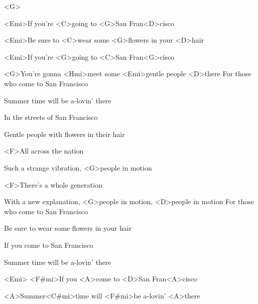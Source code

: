 

<G>

\zs
<Emi>If you're <C>going to <G>San Fran<D>cisco

<Emi>Be sure to <C>wear some <G>flowers in your <D>hair

<Emi>If you're <G>going to <C>San Fran<G>cisco

<G>You're gonna <Hmi>meet some <Emi>gentle people <D>there
\ks
\zs
For those who come to San Francisco

Summer time will be a-lovin' there

In the streets of San Francisco

Gentle people with flowers in their hair
\ks

\zr
<F>All across the nation

Such a strange vibration, <G>people in motion

<F>There's a whole generation

With a new explanation, <G>people in motion, <D>people in motion
\kr
\zs
For those who come to San Francisco

Be sure to wear some flowers in your hair

If you come to San Francisco

Summer time will be a-lovin' there
\ks

\zs
<Emi> <F#mi>If you <A>come to <D>San Fran<A>cisco

<A>Summer<C#mi>time will <F#mi>be a-lovin' <A>there
\ks
\kp
